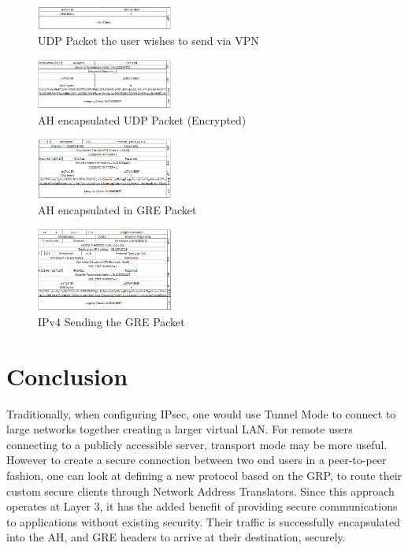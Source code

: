 \documentclass[conference,12pt]{IEEEtran}
\begin{document}
\begin{figure}
\centering
\includegraphics[width=0.4\textwidth]{udp_1.png}
\caption{UDP Packet the user wishes to send via VPN}
\label{fig:udp}
\end{figure}
\begin{figure}
\centering
\includegraphics[width=0.4\textwidth]{ipsec_2.png}
\caption{AH encapsulated UDP Packet (Encrypted)}
\label{fig:ipsec}
\end{figure}
\begin{figure}
\centering
\includegraphics[width=0.4\textwidth]{gre_3.png}
\caption{AH encapsulated in GRE Packet}
\label{fig:gre}
\end{figure}
\begin{figure}
\centering
\includegraphics[width=0.4\textwidth]{ip4_4.png}
\caption{IPv4 Sending the GRE Packet}
\label{fig:outer_ip}
\end{figure}



\section{Conclusion}
Traditionally, when configuring IPsec, one would use Tunnel Mode to connect to
large networks together creating a larger virtual LAN. For remote users
connecting to a publicly accessible server, transport mode may be more useful.
However to create a secure connection between two end users in a peer-to-peer
fashion, one can look at defining
a new protocol based on the GRP, to route their custom secure clients through
Network Address Translators. Since this approach operates at Layer 3, it has the
added benefit of providing secure communications to applications without
existing security. Their traffic is successfully encapsulated into the AH, and
GRE headers to arrive at their destination, securely.


\printbibliography
\end{document}
